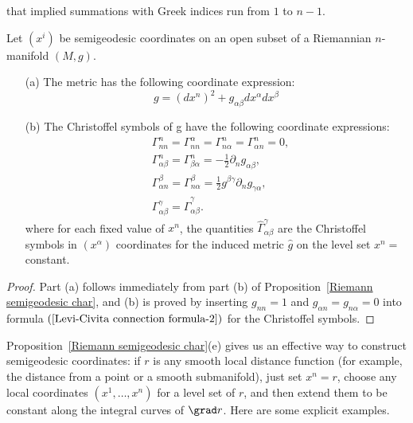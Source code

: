 that implied summations with Greek indices run from $1$ to $n-1$.
\begin{corollary}\label{Riemann semigeodesic Christoffel}
Let $(x^i)$ be semigeodesic coordinates on an open subset of a Riemannian $n$-manifold $(M,g)$.
\begin{itemize}
\item[(a)] The metric has the following coordinate expression:
\[g=(dx^n)^2+g_{\alpha\beta}dx^\alpha dx^\beta\] 
\item[(b)] The Christoffel symbols of g have the following coordinate expressions:
\begin{equation}\label{Riemann semigeodesic Christoffel-1}
\begin{aligned}
&\Gamma_{nn}^n=\Gamma_{nn}^\alpha=\Gamma_{n\alpha}^n=\Gamma_{\alpha n}^n=0,\\
&\Gamma_{\alpha\beta}^n=\Gamma_{\beta\alpha}^n=-\frac{1}{2}\partial_ng_{\alpha\beta},\\
&\Gamma_{\alpha n}^\beta=\Gamma_{n\alpha}^\beta=\frac{1}{2}g^{\beta\gamma}\partial_ng_{\gamma\alpha},\\
&\Gamma_{\alpha\beta}^\gamma=\widehat{\Gamma}_{\alpha\beta}^\gamma.
\end{aligned}
\end{equation}
where for each fixed value of $x^n$, the quantities $\widehat{\Gamma}_{\alpha\beta}^\gamma$ are the Christoffel symbols in $(x^\alpha)$ coordinates for the induced 
metric $\hat{g}$ on the level set $x^n=$ constant.
\end{itemize}
\end{corollary}
\begin{proof}
Part (a) follows immediately from part (b) of Proposition~\ref{Riemann semigeodesic char}, and (b) is proved by inserting $g_{nn}=1$ and 
$g_{\alpha n}=g_{n\alpha}=0$ into formula $(\ref{Levi-Civita connection formula-2})$ for the Christoffel symbols.
\end{proof}
Proposition~\ref{Riemann semigeodesic char}(e) gives us an effective way to construct semigeodesic coordinates: if $r$ is any smooth local distance function (for example, the distance from a 
point or a smooth submanifold), just set $x^n=r$, choose any local coordinates $(x^1,\dots,x^n)$ for a level set of $r$, and then extend them to be constant along the 
integral curves of $\grad r$. Here are some explicit examples.
